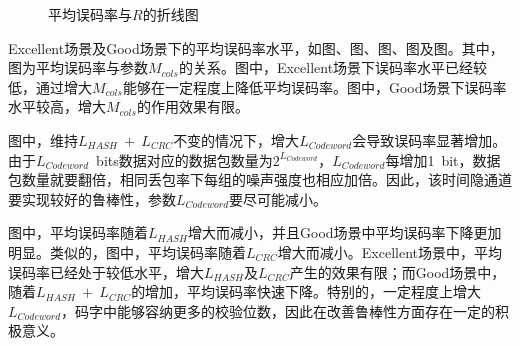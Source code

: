 {    \begin{figure}[htb]
        \centering
        \caption{平均误码率与$R$的折线图}
        \label{fig:5:result:ber:r}
    \end{figure}
}

Excellent场景及Good场景下的平均误码率水平，如图、图、图、图及图。其中，图为平均误码率与参数$M_{cols}$的关系。图中，Excellent场景下误码率水平已经较低，通过增大$M_{cols}$能够在一定程度上降低平均误码率。图中，Good场景下误码率水平较高，增大$M_{cols}$的作用效果有限。

图中，维持$L_{HASH}\ +\ L_{CRC}$不变的情况下，增大$L_{Codeword}$会导致误码率显著增加。由于{$L_{Codeword}$\ bits}数据对应的数据包数量为$2^{L_{Codeword}}$，$L_{Codeword}$每增加{1\ bit}，数据包数量就要翻倍，相同丢包率下每组的噪声强度也相应加倍。因此，该时间隐通道要实现较好的鲁棒性，参数$L_{Codeword}$要尽可能减小。

图中，平均误码率随着$L_{HASH}$增大而减小，并且Good场景中平均误码率下降更加明显。类似的，图中，平均误码率随着$L_{CRC}$增大而减小。Excellent场景中，平均误码率已经处于较低水平，增大$L_{HASH}$及$L_{CRC}$产生的效果有限；而Good场景中，随着$L_{HASH}\ +\ L_{CRC}$的增加，平均误码率快速下降。特别的，一定程度上增大$L_{Codeword}$，码字中能够容纳更多的校验位数，因此在改善鲁棒性方面存在一定的积极意义。

